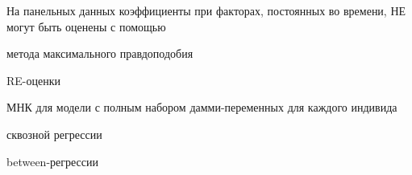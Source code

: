 
\begin{question}
На панельных данных коэффициенты при факторах, постоянных во времени, НЕ могут быть оценены с помощью
\begin{answerlist}
  \item метода максимального правдоподобия
  \item RE-оценки
  \item МНК для модели с полным набором дамми-переменных для каждого индивида
  \item сквозной регрессии
  \item between-регрессии
\end{answerlist}
\end{question}



